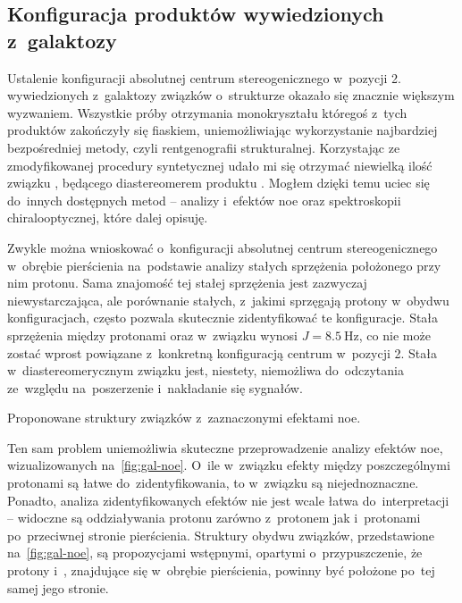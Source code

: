\subsection{Konfiguracja produktów wywiedzionych z~galaktozy}\label{stereo:galacto}
Ustalenie konfiguracji absolutnej centrum stereogenicznego w~pozycji 2. wywiedzionych
  z~galaktozy związków o~strukturze  okazało się znacznie większym wyzwaniem.
Wszystkie próby otrzymania monokryształu któregoś z~tych produktów zakończyły się fiaskiem,
  uniemożliwiając wykorzystanie najbardziej bezpośredniej metody,
  czyli rentgenografii strukturalnej.
Korzystając ze zmodyfikowanej procedury syntetycznej udało mi się otrzymać niewielką ilość związku ,
  będącego diastereomerem produktu .
Mogłem dzięki temu uciec się do~innych dostępnych metod \--- analizy \NMR*{} i~efektów \gls{noe}
  oraz spektroskopii chiralooptycznej, które dalej opisuję.

Zwykle można wnioskować o~konfiguracji absolutnej centrum stereogenicznego w~obrębie pierścienia
  na~podstawie analizy stałych sprzężenia położonego przy nim protonu.
Sama znajomość tej stałej sprzężenia jest zazwyczaj niewystarczająca, ale porównanie stałych,
  z~jakimi sprzęgają protony w~obydwu konfiguracjach, często pozwala skutecznie zidentyfikować
  te konfiguracje.
Stała sprzężenia między protonami  oraz  w~związku  wynosi
  $J = \SI{8.5}{\hertz}$, co nie może zostać wprost powiązane z~konkretną konfiguracją
  centrum w~pozycji 2.
Stała w~diastereomerycznym związku  jest, niestety,
  niemożliwa do~odczytania ze~względu na~poszerzenie i~nakładanie się sygnałów.

\begin{marginfigure}
  
  \caption{
    Proponowane struktury związków  z~zaznaczonymi
      efektami \gls{noe}.
  }\label{fig:gal-noe}
\end{marginfigure}

Ten sam problem uniemożliwia skuteczne przeprowadzenie analizy efektów \gls{noe},
  wizualizowanych na~\cref{fig:gal-noe}.
O~ile w~związku  efekty między poszczególnymi protonami są łatwe
  do~zidentyfikowania, to w~związku  są niejednoznaczne.
Ponadto, analiza zidentyfikowanych efektów nie jest wcale łatwa do~interpretacji \---
  widoczne są oddziaływania protonu  zarówno z~protonem  jak i~protonami
   po~przeciwnej stronie pierścienia.
Struktury obydwu związków, przedstawione na~\cref{fig:gal-noe}, są propozycjami wstępnymi,
  opartymi o~przypuszczenie, że protony  i~, znajdujące się w~obrębie
  pierścienia, powinny być położone po~tej samej jego stronie.


